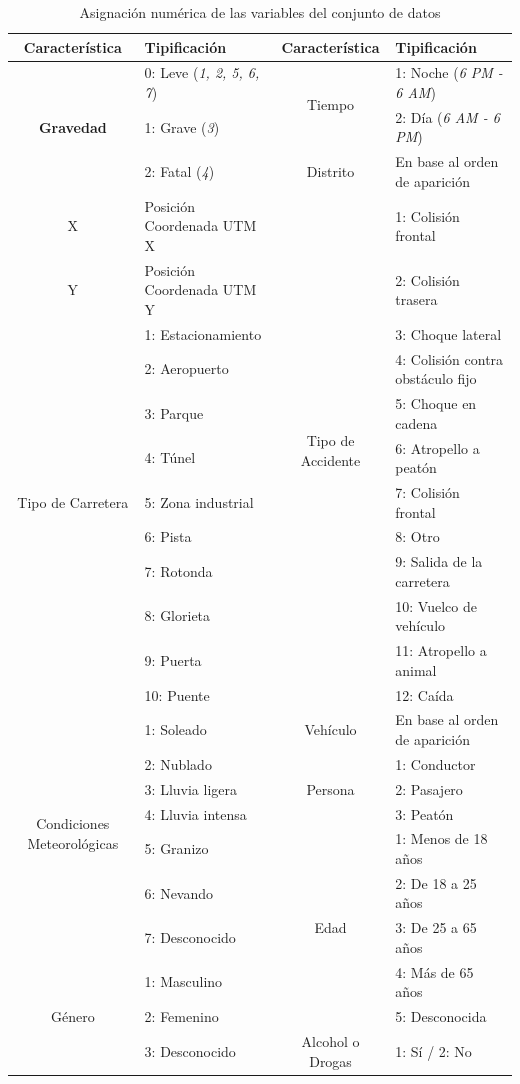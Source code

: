 \begin{table}[H]
	\centering
	\renewcommand{\arraystretch}{1.2}
	\small
	
	\begin{tabular}{|c|l|c|l|}\hline
		\textbf{Característica} & \textbf{Tipificación} & \textbf{Característica} & \textbf{Tipificación} \\ \hline
		\multirow{3}{*}{\textbf{Gravedad}} & 0: Leve (\textit{1, 2, 5, 6, 7}) & \multirow{2}{*}{Tiempo} & 1: Noche (\textit{6 PM - 6 AM}) \\
		& 1: Grave (\textit{3}) & & 2: Día (\textit{6 AM - 6 PM}) \\ \cline{3-4}
		& 2: Fatal (\textit{4}) & Distrito & En base al orden de aparición \\ \hline
		\multirow{1}{*}{X} & Posición Coordenada UTM X & \multirow{12}{*}{Tipo de Accidente} & 1: Colisión frontal \\ \cline{1-2}
		\multirow{1}{*}{Y} & Posición Coordenada UTM Y & & 2: Colisión trasera \\ \cline{1-2}
		\multirow{9}{*}{Tipo de Carretera} & 1: Estacionamiento & & 3: Choque lateral \\
		& 2: Aeropuerto & & 4: Colisión contra obstáculo fijo \\
		& 3: Parque & & 5: Choque en cadena \\
		& 4: Túnel & & 6: Atropello a peatón \\
		& 5: Zona industrial & & 7: Colisión frontal \\
		& 6: Pista & & 8: Otro \\
		& 7: Rotonda & & 9: Salida de la carretera \\
		& 8: Glorieta & & 10: Vuelco de vehículo \\
		& 9: Puerta & & 11: Atropello a animal \\
		& 10: Puente & & 12: Caída \\ \hline
		\multirow{7}{*}{Condiciones Meteorológicas} & 1: Soleado & \multirow{1}{*}{Vehículo} & En base al orden de aparición \\ \cline{3-4}
		& 2: Nublado & \multirow{3}{*}{Persona} & 1: Conductor \\
		& 3: Lluvia ligera & & 2: Pasajero \\
		& 4: Lluvia intensa & & 3: Peatón \\ \cline{3-4}
		& 5: Granizo & \multirow{5}{*}{Edad} & 1: Menos de 18 años \\
		& 6: Nevando & & 2: De 18 a 25 años \\
		& 7: Desconocido & & 3: De 25 a 65 años \\ \cline{1-2}
		\multirow{3}{*}{Género} & 1: Masculino & & 4: Más de 65 años \\
		& 2: Femenino & & 5: Desconocida \\ \cline{3-4}
		& 3: Desconocido & \multirow{1}{*}{Alcohol o Drogas} & 1: Sí / 2: No\\ \hline
	\end{tabular}
	
	\caption{Asignación numérica de las variables del conjunto de datos}
	\label{TransformacionDatosTabla}
\end{table}

